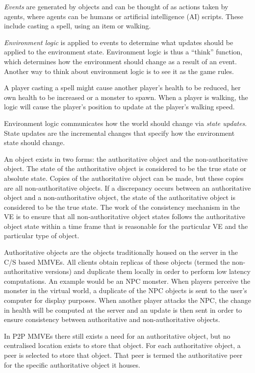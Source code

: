\emph{Events} are generated by objects and can be thought of as actions taken by agents, where agents can be humans or artificial intelligence (AI) scripts. These include casting a spell, using an item or walking.

\emph{Environment logic} is applied to events to determine what updates should be applied to the environment state. Environment logic is thus a ``think'' function, which determines how the environment should change as a result of an event. Another way to think about environment logic is to see it as the game rules.

A player casting a spell might cause another player's health to be reduced, her own health to be increased or a monster to spawn. When a player is walking, the logic will cause the player's position to update at the player's walking speed.

Environment logic communicates how the world should change via \emph{state updates}. State updates are the incremental changes that specify how the environment state should change.

An object exists in two forms: the authoritative object and the non-authoritative object. The state of the authoritative object is considered to be the true state or absolute state. Copies of the authoritative object can be made, but these copies are all non-authoritative objects. If a discrepancy occurs between an authoritative object and a non-authoritative object, the state of the authoritative object is considered to be the true state. The work of the consistency mechanism in the VE is to ensure that all non-authoritative object states follows the authoritative object state within a time frame that is reasonable for the particular VE and the particular type of object.

Authoritative objects are the objects traditionally housed on the server in the C/S based MMVEs. All clients obtain replicas of these objects (termed the non-authoritative versions) and duplicate them locally in order to perform low latency computations. An example would be an NPC monster. When players perceive the monster in the virtual world, a duplicate of the NPC objects is sent to the user's computer for display purposes. When another player attacks the NPC, the change in health will be computed at the server and an update is then sent in order to ensure consistency between authoritative and non-authoritative objects.

In P2P MMVEs there still exists a need for an authoritative object, but no centralised location exists to store that object. For each authoritative object, a peer is selected to store that object. That peer is termed the authoritative peer for the specific authoritative object it houses.

